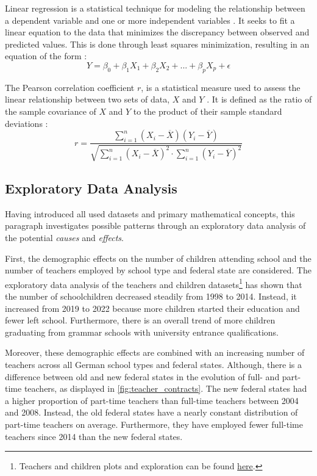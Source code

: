 Linear regression is a statistical technique for modeling the relationship between a dependent variable and one or more independent variables \cite{james_introduction_2021}. It seeks to fit a linear equation to the data that minimizes the discrepancy between observed and predicted values. This is done through least squares minimization, resulting in an equation of the form \cite{james_introduction_2021}:
\begin{equation}
    Y = \beta_0 + \beta_1 X_1 + \beta_2 X_2 +  ...+ \beta_p X_p + \epsilon 
\end{equation}

The Pearson correlation coefficient $r$, is a statistical measure used to assess the linear relationship between two sets of data, $X$ and $Y$ \cite{rodgers_thirteen_1988}. It is defined as the ratio of the sample covariance of $X$ and $Y$ to the product of their sample standard deviations \cite{rodgers_thirteen_1988}:
\begin{equation}
    r = \frac{\sum_{i=1}^n (X_i - \overline{X}) (Y_i - \overline{Y})}{\sqrt{\sum_{i=1}^n(X_i-\overline{X})^2 \cdot \sum_{i=1}^n(Y_i-\overline{Y})^2}}
\end{equation}

\subsection{Exploratory Data Analysis}\label{sec:analysis}
Having introduced all used datasets and primary mathematical concepts, this paragraph investigates possible patterns through an exploratory data analysis of the potential \emph{causes} and \emph{effects}. 

First, the demographic effects on the number of children attending school and the number of teachers employed by school type and federal state are considered. The exploratory data analysis of the teachers and children datasets\footnote{\label{footnote:teachers-children}Teachers and children plots and exploration can be found \href{https://github.com/KarylReyne/DataLiteracyWS23/blob/main/exp/TF-005-TeachersToChildren.ipynb}{here}.} has shown that the number of schoolchildren decreased steadily from 1998 to 2014. Instead, it increased from 2019 to 2022 because more children started their education and fewer left school. Furthermore, there is an overall trend of more children graduating from grammar schools with university entrance qualifications.

Moreover, these demographic effects are combined with an increasing number of teachers across all German school types and federal states. %
Although, there is a difference between old and new federal states in the evolution of full- and part-time teachers, as displayed in \autoref{fig:teacher_contracts}. The new federal states had a higher proportion of part-time teachers than full-time teachers between 2004 and 2008. Instead, the old federal states have a nearly constant distribution of part-time teachers on average. Furthermore, they have employed fewer full-time teachers since 2014 than the new federal states. 

